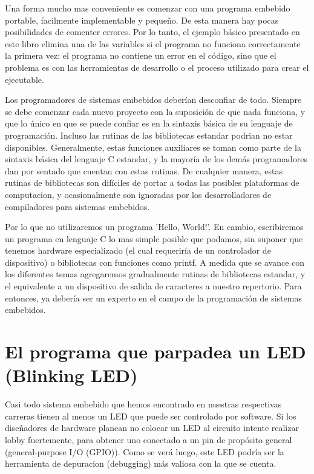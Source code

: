 \documentclass[12pt]{article}
\begin{document}
Una forma mucho mas conveniente es comenzar con una programa embebido portable,
facilmente implementable y pequeño. De esta manera hay pocas posibilidades de
comenter errores. Por lo tanto, el ejemplo básico presentado en este libro elimina
una de las variables si el programa no funciona correctamente la primera vez:
el programa no contiene un error en el código, sino que el problema es con las
herramientas de desarrollo o el proceso utilizado para crear el ejecutable.


Los programadores de sistemas embebidos deberían desconfiar de todo. Siempre se debe comenzar cada nuevo proyecto con la 
suposición de que nada funciona, y que lo único en que se puede confiar 
es en la sintaxis básica de su lenguaje de programación.
Incluso las rutinas de las bibliotecas estandar podrian no estar disponibles.
Generalmente, estas funciones auxiliares se toman como parte de la
sintaxis básica del lenguaje C estandar, y la mayoría de los demás programadores dan por sentado que cuentan con estas rutinas. De cualquier manera, 
estas rutinas de bibliotecas son difíciles de portar a todas las posibles
plataformas de computacion, y ocasionalmente son ignoradas
por los desarrolladores de compiladores para sistemas embebidos.

Por lo que no utilizaremos un programa 'Hello, World!'. En cambio, escribiremos
un programa en lenguaje C lo mas simple posible que podamos, sin suponer
que tenemos hardware especializado (el cual requeriría de un controlador de dispositivo) o bibliotecas con funciones como printf.
A medida que se avance con los diferentes temas agregaremos gradualmente
rutinas de bibliotecas estandar, y el equivalente a un dispositivo de 
salida de caracteres a nuestro repertorio.
Para entonces, ya debería ser un experto en el campo de la programación de sistemas
embebidos.

\section *{El programa que parpadea un LED (Blinking LED)}

Casi todo sistema embebido que hemos encontrado en nuestras respectivas
carreras tienen al menos un LED que puede ser controlado por software.
Si los diseñadores de hardware planean no colocar un LED al circuito intente
realizar lobby fuertemente, para obtener uno conectado a un pin de propósito
general (general-purpose I/O (GPIO)). Como se verá luego, este LED
podría ser la herramienta de depuracion (debugging) más valiosa con la que
se cuenta.
\end{document}
